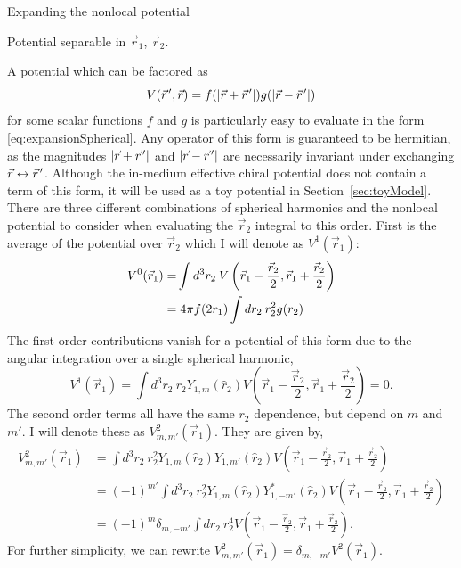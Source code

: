 \begin{section}{Expanding the nonlocal potential}
\begin{subsection}{Potential separable in $\vec{r}_1$, $\vec{r}_2$.\label{subsec:form1}}

A potential which can be factored as 
\begin{equation}
V(\vec{r}\mkern2mu',\vec{r})=f(|\vec{r}+\vec{r}\mkern2mu'|)g(|\vec{r}-\vec{r}\mkern2mu'|)
\end{equation}
for some scalar functions $f$ and $g$ is particularly easy to evaluate in the form \eqref{eq:expansionSpherical}. Any operator of this form is guaranteed to be hermitian, as the magnitudes $|\vec{r}+\vec{r}\mkern2mu'|$ and $|\vec{r}-\vec{r}\mkern2mu'|$ are necessarily invariant under exchanging $\vec{r} \leftrightarrow \vec{r}\mkern2mu'$. Although the in-medium effective chiral potential does not contain a term of this form, it will be used as a toy potential in Section~\ref{sec:toyModel}. There are three different combinations of spherical harmonics and the nonlocal potential to consider when evaluating the $\vec{r}_2$ integral to this order. First is the average of the potential over $\vec{r}_2$ which I will denote as $V^1(\vec{r}_1)$:
\begin{equation}\label{eq:V0}
\begin{split}
V^0(\vec{r}_1)=&\int d^3r_2\: V\left(\vec{r}_1-\frac{\vec{r}_2}{2},\vec{r}_1+\frac{\vec{r}_2}{2}\right) \\
=&\hspace{.1cm}4\pi f(2r_1) \int dr_2\: r_2^2 g(r_2)
\end{split}
\end{equation}
The first order contributions vanish for a potential of this form due to the angular integration over a single spherical harmonic,
\begin{equation}\label{eq:V1}
V^1(\vec{r}_1)=\int d^3r_2\:  r_2Y_{1,m}(\hat{r}_2)V\left(\vec{r}_1-\frac{\vec{r}_2}{2},\vec{r}_1+\frac{\vec{r}_2}{2}\right)=0.
\end{equation}
The second order terms all have the same $r_2$ dependence, but depend on $m$ and $m'$. I will denote these as $V^2_{m,m'}(\vec{r}_1)$. They are given by,
\begin{equation}\begin{split}
\label{eq:V2}
V^2_{m,m'}(\vec{r}_1)&=\int d^3r_2\: r_2^2Y_{1,m}(\hat{r}_2)Y_{1,m'}(\hat{r}_2)V\left(\vec{r}_1-\frac{\vec{r}_2}{2},\vec{r}_1+\frac{\vec{r}_2}{2}\right) \\
&=(-1)^{m'}\int d^3r_2\: r_2^2Y_{1,m}(\hat{r}_2)Y^*_{1,-m'}(\hat{r}_2)V\left(\vec{r}_1-\frac{\vec{r}_2}{2},\vec{r}_1+\frac{\vec{r}_2}{2}\right)\\
&=(-1)^m\delta_{m,-m'}\int d r_2 \:r_2^4 V\left(\vec{r}_1-\frac{\vec{r}_2}{2},\vec{r}_1+\frac{\vec{r}_2}{2}\right).
\end{split}
\end{equation}
For further simplicity, we can rewrite $V^2_{m,m'}(\vec{r}_1)=\delta_{m,-m'}V^2(\vec{r}_1)$.


\end{subsection}
\end{section}
